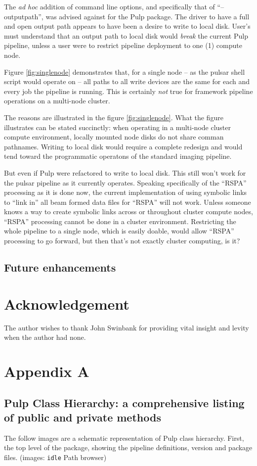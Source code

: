 \documentclass[a4paper,10pt,bibtotoc]{scrartcl}
\begin{document}
The \emph{ad hoc} addition of command line options, and
specifically that of  ``--outputpath'',  was advised against for
the Pulp package.  The driver to have a full and open output path appears
to have been a desire to write to local disk.  User's must understand
that an output path to local disk would \emph{break} the current Pulp
pipeline, unless a user were to restrict pipeline deployment to one
(1) compute node.


Figure \ref{fig:singlenode}  demonstrates that, for a single node --
as the pulsar shell script  would operate on -- all paths to all write
devices are the same for each and every job the pipeline is
running. This is certainly \emph{not} true for framework pipeline
  operations on a multi-node cluster.

The reasons are illustrated in the figure \ref{fig:singlenode}.  What
the figure illustrates can be stated succinctly: when operating in a
multi-node cluster compute environment, locally mounted node disks do
not share comman pathnames.  Writing to local disk would require a
complete redesign and would tend toward the programmatic operatons of
the standard imaging pipeline.

But even if Pulp were refactored to write to local disk.  This still
won't work for the pulsar pipeline as it currently operates.  Speaking
specifically of the ``RSPA'' processing as it is done now, the current
implementation of using symbolic links to ``link in'' all beam formed
data files for ``RSPA'' will not work.  Unless someone knows a way to
create symbolic links across or throughout cluster compute nodes,
``RSPA'' processing cannot be done in a cluster environment.
Restricting the whole pipeline to a single node, which is easily
doable, would allow ``RSPA'' processing to go forward, but then that's
not exactly cluster computing, is it?

\subsection{Future enhancements}
\section{Acknowledgement}
The author wishes to thank John Swinbank for providing vital insight
and levity when the author had none.
\newpage
\section{Appendix A}
\subsection{Pulp Class Hierarchy: a comprehensive listing of public and private methods}
\label{sec:future-enhancements}
The follow images are a schematic representation of Pulp class
hierarchy.  First, the top level of the package, showing the pipeline
definitions, version and package files. (images: \verb|idle| Path browser)
\end{document}
